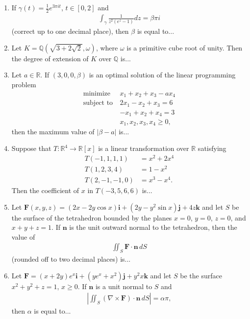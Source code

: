 \documentclass[journal]{IEEEtran}
\numberwithin{equation}{enumi}
\numberwithin{figure}{enumi}
\begin{document}
\begin{enumerate}[start=53]
\item If \(\gamma(t) = \frac{1}{2} e^{3\pi i t}\), \(t \in [0, 2]\) and
\begin{align*}
    \int_{\gamma} \frac{1}{z^2(e^z - 1)} dz = \beta \pi i
\end{align*}
(correct up to one decimal place), then \(\beta\) is equal to...

\item Let \(K = \mathbb{Q}(\sqrt{3 + 2\sqrt{2}}, \omega)\), where \(\omega\) is a primitive cube root of unity. Then the degree of extension of \(K\) over \(\mathbb{Q}\) is...

\item Let \(a \in \mathbb{R}\). If \((3,0,0,\beta)\) is an optimal solution of the linear programming problem
    \begin{align*}
        \text{minimize} \ & x_1 + x_2 + x_3 - ax_4 \\
        \text{subject to} \ & 2x_1 - x_2 + x_3 = 6 \\
        & -x_1 + x_2 + x_4 = 3 \\
        & x_1, x_2, x_3, x_4 \geq 0,
    \end{align*}
    then the maximum value of \(|\beta - a|\) is...

\item Suppose that \(T: \mathbb{R}^4 \rightarrow \mathbb{R}[x]\) is a linear transformation over \(\mathbb{R}\) satisfying
\begin{align*}
    T(-1,1,1,1) &= x^2 + 2x^4 \\
    T(1,2,3,4) &= 1 - x^2 \\
    T(2,-1,-1,0) &= x^3 - x^4.
\end{align*}
Then the coefficient of \(x\) in \(T(-3,5,6,6)\) is...

\item Let \(\mathbf{F}(x,y,z) = (2x - 2y\cos x)\mathbf{i} + (2y - y^2\sin x)\mathbf{j} + 4z\mathbf{k}\) and let \(S\) be the surface of the tetrahedron bounded by the planes \(x = 0\), \(y = 0\), \(z = 0\), and \(x + y + z = 1\). If \(\mathbf{n}\) is the unit outward normal to the tetrahedron, then the value of
\begin{align*}
    \iint_S \mathbf{F} \cdot \mathbf{n} \, dS 
\end{align*}
(rounded off to two decimal places) is...

\item Let \(\mathbf{F} = (x + 2y)e^x \mathbf{i} + (ye^x + x^2)\mathbf{j} + y^2x\mathbf{k}\) and let \(S\) be the surface \(x^2 + y^2 + z = 1\), \(x \geq 0\). If \(\mathbf{n}\) is a unit normal to \(S\) and
\begin{align*}
    \left| \iint_S (\nabla \times \mathbf{F}) \cdot \mathbf{n} \, dS \right| = \alpha \pi, 
\end{align*}
then \(\alpha\) is equal to...


\end{enumerate}
\end{document}
